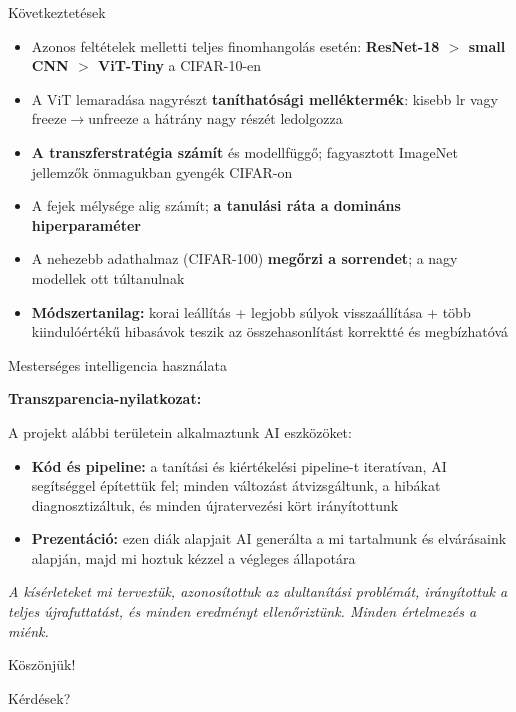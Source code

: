 \documentclass{beamer}
\begin{document}
\begin{frame}{Következtetések}

  \footnotesize
  \begin{itemize}\setlength{\itemsep}{1pt}
    \item Azonos feltételek melletti teljes finomhangolás esetén:
          \textbf{ResNet-18 $>$ small CNN $>$ ViT-Tiny} a CIFAR-10-en
    \item A ViT lemaradása nagyrészt \textbf{taníthatósági melléktermék}: kisebb lr vagy
          freeze$\!\to\!$unfreeze a hátrány nagy részét ledolgozza
    \item \textbf{A transzferstratégia számít} és modellfüggő;
          fagyasztott ImageNet jellemzők önmagukban gyengék CIFAR-on
    \item A fejek mélysége alig számít;
          \textbf{a tanulási ráta a domináns hiperparaméter}
    \item A nehezebb adathalmaz (CIFAR-100) \textbf{megőrzi a sorrendet};
          a nagy modellek ott túltanulnak
    \item \textbf{Módszertanilag:} korai leállítás + legjobb súlyok visszaállítása +
          több kiindulóértékű hibasávok teszik az összehasonlítást korrektté és megbízhatóvá
  \end{itemize}


\end{frame}

\begin{frame}{Mesterséges intelligencia használata}

  \textbf{Transzparencia-nyilatkozat:}

  \small
  A projekt alábbi területein alkalmaztunk AI eszközöket:
  \begin{itemize}
    \item \textbf{Kód és pipeline:} a tanítási és kiértékelési pipeline-t iteratívan,
          AI segítséggel építettük fel; minden változást átvizsgáltunk,
          a hibákat diagnosztizáltuk, és minden újratervezési kört irányítottunk
    \item \textbf{Prezentáció:} ezen diák alapjait AI generálta a mi tartalmunk és elvárásaink alapján, majd mi hoztuk kézzel a végleges állapotára
  \end{itemize}

  \medskip
  \textit{A kísérleteket mi terveztük, azonosítottuk az alultanítási problémát,
  irányítottuk a teljes újrafuttatást, és minden eredményt ellenőriztünk.
  Minden értelmezés a miénk.}

\end{frame}

\begin{frame}{Köszönjük!}

  \begin{center}
    \vspace{1cm}
    \Large Kérdések?
  \end{center}

\end{frame}
\end{document}
